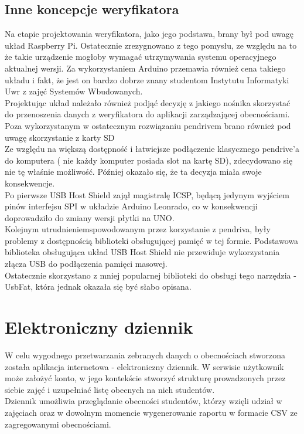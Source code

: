 \documentclass[declaration,shortabstract, mgr]{iithesis}
\begin{document}
\subsection{Inne koncepcje weryfikatora}
\indent Na etapie projektowania weryfikatora, jako jego podstawa, brany był pod uwagę układ Raspberry Pi. Ostatecznie zrezygnowano z tego pomysłu, ze względu na to że takie urządzenie mogłoby wymagać utrzymywania systemu operacyjnego aktualnej wersji. Za wykorzystaniem Arduino przemawia również cena takiego układu i fakt, że jest on bardzo dobrze znany studentom Instytutu Informatyki Uwr z zajęć Systemów Wbudowanych.\\
\indent Projektując układ należało również podjąć decyzję z jakiego nośnika skorzystać do przenoszenia danych z weryfikatora do aplikacji zarządzającej obecnościami. Poza wykorzystanym w ostatecznym rozwiązaniu pendrivem brano również pod uwagę skorzystanie z karty SD \\
\indent Ze względu na większą dostępność i łatwiejsze podłączenie klasycznego pendrive'a do komputera ( nie każdy komputer posiada slot na kartę SD), zdecydowano się nie tę właśnie możliwość. Później okazało się, że ta decyzja miała swoje konsekwencje.\\
\indent Po pierwsze USB Host Shield zajął magistralę ICSP, będącą jedynym wyjściem pinów interfejsu SPI w układzie Arduino Leonrado, co w konsekwencji doprowadziło do zmiany wersji płytki na UNO. \\
\indent Kolejnym utrudnieniemspowodowanym przez korzystanie z pendriva, były problemy z dostępnością biblioteki obsługującej pamięć w tej formie. Podstawowa biblioteka obsługująca układ USB Host Shield nie przewiduje wykorzystania złącza USB do podłączenia pamięci masowej. \\
\indent Ostatecznie skorzystano z mniej popularnej biblioteki do obsługi tego narzędzia - UsbFat\cite{usbfat}, która jednak okazała się być słabo opisana.

\section{Elektroniczny dziennik}
\indent W celu wygodnego przetwarzania zebranych danych o obecnościach stworzona została aplikacja internetowa - elektroniczny dziennik. W serwisie użytkownik może założyć konto, w jego kontekście stworzyć strukturę prowadzonych przez siebie zajęć i uzupełniać listę obecnych na nich studentów.\\
\indent Dziennik umożliwia przeglądanie obecności studentów, którzy wzięli udział w zajęciach oraz w dowolnym momencie wygenerowanie raportu w formacie CSV ze zagregowanymi obecnościami.
\end{document}
